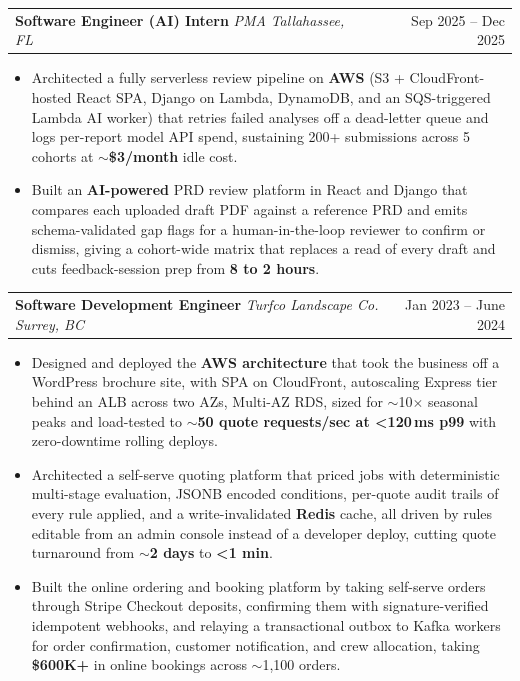 \documentclass[letterpaper,11pt]{article}
\makeatletter
\newcommand{\BulletItems}[1]{
  \item
    \begin{itemize}[label={-}, leftmargin=*, labelsep=0.3em, topsep=0pt, partopsep=0pt, itemsep=0pt, parsep=0pt]
      \small #1
    \end{itemize}\vspace{-5pt}
}
\newcommand{\SLSubheadingItemFF}[4]{
  \vspace{-2pt}\item
    \begin{tabular*}{0.97\textwidth}[t]{l@{\extracolsep{\fill}}r}
      \textbf{#1} \textbar{} \textit{\small #2} \textbar{} \textit{\small #3} & {\small #4} \\
    \end{tabular*}\vspace{-7pt}
}
\newcommand{\swallow}[1]{}
\makeatother
\begin{document}
{    %
    }
    \SLSubheadingItemFF
      {Software Engineer (AI) Intern}
      {PMA}
      {Tallahassee, FL}
      {Sep 2025 -- Dec 2025}
    \BulletItems{
      \item Architected a fully serverless review pipeline on \textbf{AWS} (S3 + CloudFront-hosted React SPA, Django on Lambda, DynamoDB, and an SQS-triggered Lambda AI worker) that retries failed analyses off a dead-letter queue and logs per-report model API spend, sustaining 200+ submissions across 5 cohorts at \textbf{$\sim$\$3/month} idle cost.
      \item Built an \textbf{AI-powered} PRD review platform in React and Django that compares each uploaded draft PDF against a reference PRD and emits schema-validated gap flags for a human-in-the-loop reviewer to confirm or dismiss, giving a cohort-wide matrix that replaces a read of every draft and cuts feedback-session prep from \textbf{8 to 2 hours}.
      }
    \SLSubheadingItemFF
      {Software Development Engineer}
      {Turfco Landscape Co.}
      {Surrey, BC}
      {Jan 2023 -- June 2024}
    \BulletItems{
      \item Designed and deployed the \textbf{AWS architecture} that took the business off a WordPress brochure site, with SPA on CloudFront, autoscaling Express tier behind an ALB across two AZs, Multi-AZ RDS, sized for $\sim$10$\times$ seasonal peaks and load-tested to \textbf{$\sim$50 quote requests/sec at \textless{}120\,ms p99} with zero-downtime rolling deploys.
      \item Architected a self-serve quoting platform that priced jobs with deterministic multi-stage evaluation, JSONB encoded conditions, per-quote audit trails of every rule applied, and a write-invalidated \textbf{Redis} cache, all driven by rules editable from an admin console instead of a developer deploy, cutting quote turnaround from \textbf{$\sim$2 days} to \textbf{\textless{}1 min}.
      \item Built the online ordering and booking platform by taking self-serve orders through Stripe Checkout deposits, confirming them with signature-verified idempotent webhooks, and relaying a transactional outbox to Kafka\swallow{SQS + SNS} workers for order confirmation, customer notification, and crew allocation, taking \textbf{\$600K+} in online bookings across $\sim$1{,}100 orders. 
    } 
\end{document}
